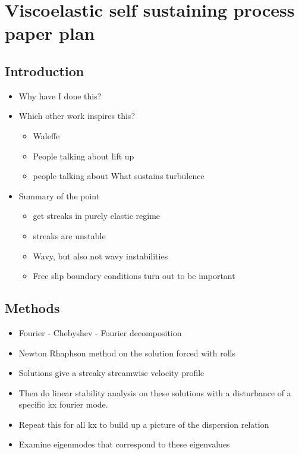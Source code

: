 \section{Viscoelastic self sustaining process paper
plan}\label{viscoelastic-self-sustaining-process-paper-plan}

\subsection{Introduction}\label{introduction}

\begin{itemize}
\itemsep1pt\parskip0pt
\item
  Why have I done this?
\item
  Which other work inspires this?

  \begin{itemize}
  \itemsep1pt\parskip0pt
  \item
    Waleffe
  \item
    People talking about lift up
  \item
    people talking about What sustains turbulence
  \end{itemize}
\item
  Summary of the point

  \begin{itemize}
  \itemsep1pt\parskip0pt
  \item
    get streaks in purely elastic regime
  \item
    streaks are unstable
  \item
    Wavy, but also not wavy instabilities
  \item
    Free slip boundary conditions turn out to be important
  \end{itemize}
\end{itemize}

\subsection{Methods}\label{methods}

\begin{itemize}
\itemsep1pt\parskip0pt
\item
  Fourier - Chebyshev - Fourier decomposition
\item
  Newton Rhaphson method on the solution forced with rolls
\item
  Solutions give a streaky streamwise velocity profile
\item
  Then do linear stability analysis on these solutions with a
  disturbance of a specific kx fourier mode.
\item
  Repeat this for all kx to build up a picture of the dispersion
  relation
\item
  Examine eigenmodes that correspond to these eigenvalues
\end{itemize}

